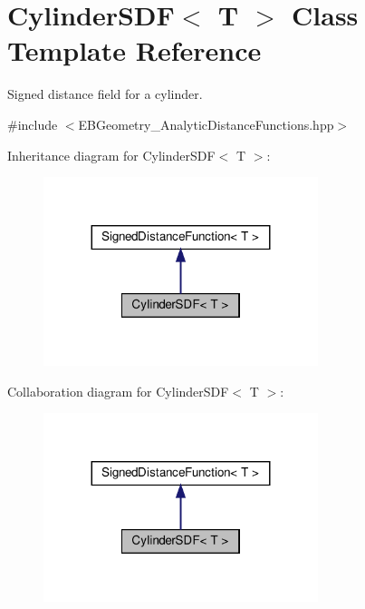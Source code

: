 \hypertarget{classCylinderSDF}{}\section{Cylinder\+S\+DF$<$ T $>$ Class Template Reference}
\label{classCylinderSDF}


Signed distance field for a cylinder.  




{\ttfamily \#include $<$E\+B\+Geometry\+\_\+\+Analytic\+Distance\+Functions.\+hpp$>$}



Inheritance diagram for Cylinder\+S\+DF$<$ T $>$\+:\nopagebreak
\begin{figure}[H]
\begin{center}
\leavevmode
\includegraphics[width=227pt]{classCylinderSDF__inherit__graph}
\end{center}
\end{figure}


Collaboration diagram for Cylinder\+S\+DF$<$ T $>$\+:\nopagebreak
\begin{figure}[H]
\begin{center}
\leavevmode
\includegraphics[width=227pt]{classCylinderSDF__coll__graph}
\end{center}
\end{figure}
